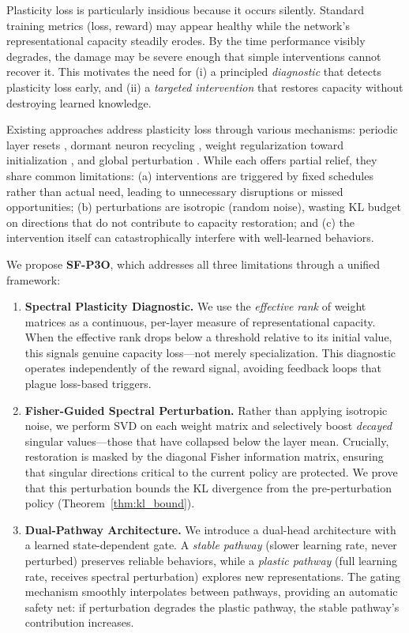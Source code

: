 \documentclass{article}
\begin{document}
Plasticity loss is particularly insidious because it occurs silently. Standard training metrics (loss, reward) may appear healthy while the network's representational capacity steadily erodes. By the time performance visibly degrades, the damage may be severe enough that simple interventions cannot recover it. This motivates the need for (i) a principled \emph{diagnostic} that detects plasticity loss early, and (ii) a \emph{targeted intervention} that restores capacity without destroying learned knowledge.

Existing approaches address plasticity loss through various mechanisms: periodic layer resets \citep{nikishin2022primacy}, dormant neuron recycling \citep{sokar2023dormant}, weight regularization toward initialization \citep{kumar2023maintaining}, and global perturbation \citep{ash2020warm}. While each offers partial relief, they share common limitations: (a) interventions are triggered by fixed schedules rather than actual need, leading to unnecessary disruptions or missed opportunities; (b) perturbations are isotropic (random noise), wasting KL budget on directions that do not contribute to capacity restoration; and (c) the intervention itself can catastrophically interfere with well-learned behaviors.

We propose \textbf{SF-P3O}, which addresses all three limitations through a unified framework:

\begin{enumerate}
    \item \textbf{Spectral Plasticity Diagnostic.} We use the \emph{effective rank} \citep{roy2007effective} of weight matrices as a continuous, per-layer measure of representational capacity. When the effective rank drops below a threshold relative to its initial value, this signals genuine capacity loss---not merely specialization. This diagnostic operates independently of the reward signal, avoiding feedback loops that plague loss-based triggers.

    \item \textbf{Fisher-Guided Spectral Perturbation.} Rather than applying isotropic noise, we perform SVD on each weight matrix and selectively boost \emph{decayed} singular values---those that have collapsed below the layer mean. Crucially, restoration is masked by the diagonal Fisher information matrix, ensuring that singular directions critical to the current policy are protected. We prove that this perturbation bounds the KL divergence from the pre-perturbation policy (Theorem~\ref{thm:kl_bound}).

    \item \textbf{Dual-Pathway Architecture.} We introduce a dual-head architecture with a learned state-dependent gate. A \emph{stable pathway} (slower learning rate, never perturbed) preserves reliable behaviors, while a \emph{plastic pathway} (full learning rate, receives spectral perturbation) explores new representations. The gating mechanism smoothly interpolates between pathways, providing an automatic safety net: if perturbation degrades the plastic pathway, the stable pathway's contribution increases.
\end{enumerate}
\end{document}
